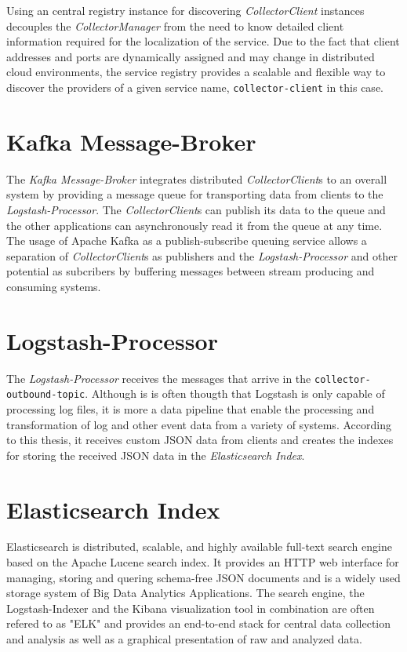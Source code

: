 Using an central registry instance for discovering \textit{CollectorClient} instances decouples the \textit{CollectorManager} from the
need to know detailed client information required for the localization of the service. Due to the fact that
client addresses and ports are dynamically assigned and may change in distributed cloud environments, the service registry provides
a scalable and flexible way to discover the providers of a given service name, \verb|collector-client| in this case.

\section{Kafka Message-Broker}

The \textit{Kafka Message-Broker} integrates distributed \textit{CollectorClient}s to an overall system by providing a
message queue for transporting data from clients to the \textit{Logstash-Processor}. The \textit{CollectorClient}s can publish
its data to the queue and the other applications can asynchronously read it from the queue at any time.
The usage of Apache Kafka as a publish-subscribe queuing service allows a separation of \textit{CollectorClient}s as publishers and the
\textit{Logstash-Processor} and other potential as subcribers by buffering messages between stream producing and consuming systems.

\section{Logstash-Processor}
The \textit{Logstash-Processor} receives the messages that arrive in the \verb|collector-outbound-topic|. Although is is often thougth that
Logstash is only capable of processing log files, it is more a data pipeline that enable the processing and transformation of log and other
event data from a variety of systems. According to this thesis, it receives custom JSON data from clients and creates the indexes
for storing the received JSON data in the \textit{Elasticsearch Index}.

\section{Elasticsearch Index}

Elasticsearch is distributed, scalable, and highly available full-text search engine based on the Apache Lucene search index.
It provides an HTTP web interface for managing, storing and quering schema-free JSON documents and is a widely used storage system
of Big Data Analytics Applications. The search engine, the Logstash-Indexer and the Kibana visualization tool in combination are
often refered to as "ELK" and provides an end-to-end stack for central data collection and analysis as well as a graphical
presentation of raw and analyzed data.


